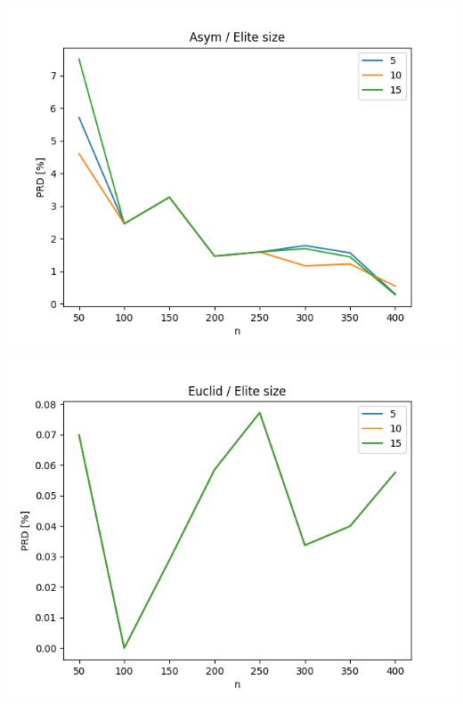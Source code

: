\documentclass{article}
\begin{document}
\begin{center}
\includegraphics[width=\textwidth, 
                   height = 0.4\textheight, 
                   keepaspectratio]
                  {plots/asym_4_elite_num} 
\end{center}

\begin{center}
\includegraphics[width=\textwidth, 
                   height = 0.4\textheight, 
                   keepaspectratio]
                  {plots/euclid_4_elite_num} 
\end{center}
\end{document}
